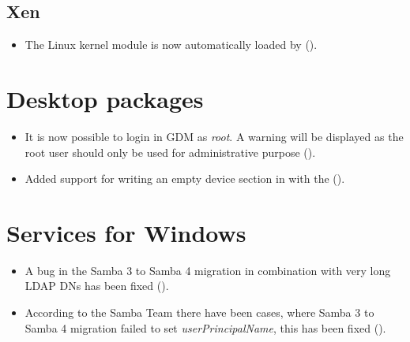 \subsection{Xen}
\begin{itemize}
\item The Linux kernel module  is now
  automatically loaded by 
  ().
\end{itemize}



\section{Desktop packages}
\begin{itemize}
\item It is now possible to login in GDM as \emph{root}. A warning
  will be displayed as the root user should only be used for
  administrative purpose ().
\item Added support for writing an empty device section in
   with the 
  ().
\end{itemize}

\section{Services for Windows}

\begin{itemize}
\item A bug in the Samba 3 to Samba 4 migration in combination with
  very long LDAP DNs has been fixed ().
\item According to the Samba Team there have been cases, where Samba 3
  to Samba 4 migration failed to set \emph{userPrincipalName}, this has been
  fixed ().
\end{itemize}

